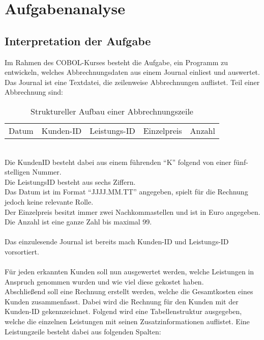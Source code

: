 \chapter{Aufgabenanalyse}\label{ch:aufgabenanalyse}


\section{Interpretation der Aufgabe}\label{sec:interpretation-der-aufgabe}
Im Rahmen des COBOL-Kurses besteht die Aufgabe, ein Programm zu entwickeln, welches Abbrechnungsdaten aus einem Journal einliest und auswertet.\\
\noindent
Das Journal ist eine Textdatei, die zeilenweise Abbrechnungen auflistet. Teil einer Abbrechnung sind: 

\begin{table}[h]
    \centering
    \begin{tabular}{|l|l|l|l|l|}
        Datum & Kunden-ID & Leistungs-ID & Einzelpreis & Anzahl
    \end{tabular}
    \caption{Struktureller Aufbau einer Abbrechnungszeile}
\end{table}

\noindent
\\
Die KundenID besteht dabei aus einem führenden \enquote{K} folgend von einer fünf-stelligen Nummer.\\
Die LeistungsID besteht aus sechs Ziffern.\\
Das Datum ist im Format \enquote{JJJJ.MM.TT} angegeben, spielt für die Rechnung jedoch keine relevante Rolle.\\
Der Einzelpreis besitzt immer zwei Nachkommastellen und ist in Euro angegeben.\\
Die Anzahl ist eine ganze Zahl bis maximal 99.\\
\\
Das einzulesende Journal ist bereits mach Kunden-ID und Leistungs-ID vorsortiert.
\\
\\
Für jeden erkannten Kunden soll nun ausgewertet werden, welche Leistungen in Anspruch genommen wurden und wie viel diese gekostet haben.
\\
Abschließend soll eine Rechnung erstellt werden, welche die Gesamtkosten eines Kunden zusammenfasst. Dabei wird die Rechnung für den Kunden mit der Kunden-ID gekennzeichnet. Folgend wird eine Tabellenstruktur ausgegeben, welche die einzelnen Leistungen mit seinen Zusatzinformationen auflistet. Eine Leistungzeile besteht dabei aus folgenden Spalten:\\

